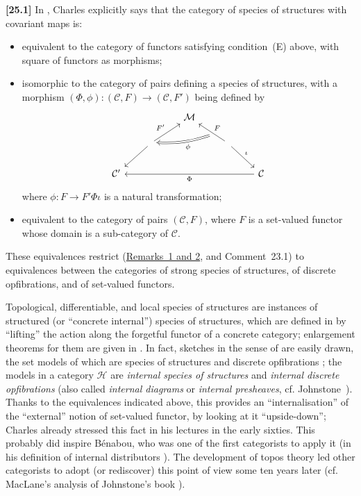 \documentclass[a4paper,fleqn]{article}
\theoremstyle{plain}
\theoremstyle{definition}
\newenvironment{longcomm}[1]
  {\noindent\textbf{[#1]}\rmfamily}
  {}
\newcommand{\CC}{\mathcal{C}}
\newcommand{\HH}{\mathcal{H}}
\newcommand{\MM}{\mathcal{M}}
\begin{document}
\begin{longcomm}{25.1}
  In \cite{coll55}, Charles explicitly says that the category of species of structures with covariant maps is:

  \begin{itemize}
    \item equivalent to the category of functors satisfying condition~(E) above, with square of functors as morphisms;

    \item isomorphic to the category of pairs defining a species of structures, with a morphism $(\Phi,\phi)\colon(\CC,F)\to(\CC,F')$ being defined by
      \[
        \begin{tikzcd}
          &&\MM
        \\& \ar[ur,"F'"] \ar[dl]
          && \ar[ul,swap,"F",""{below,name=F}] \ar[dr,"\iota"] \ar[ll,from=F,Rightarrow,bend left=10,"\phi"]
        \\\CC'
          &&&& \CC \ar[llll,"\Phi"]
        \end{tikzcd}
      \]
      where $\phi\colon F\to F'\Phi\iota$ is a natural transformation;

    \item equivalent to the category of pairs $(\CC,F)$, where $F$ is a set-valued functor whose domain is a sub-category of $\CC$.
  \end{itemize}

  These equivalences restrict (\hyperref[remark:i-2]{Remarks~1 and 2}, and Comment~23.1) to equivalences between the categories of strong species of structures, of discrete opfibrations, and of set-valued functors.

  Topological, differentiable, and local species of structures are instances of structured (or ``concrete internal'') species of structures, which are defined in \cite{coll59,coll60} by ``lifting'' the action along the forgetful functor of a concrete category;
  enlargement theorems for them are given in \cite{coll89,coll90,coll95,coll96}.
  In fact, sketches in the sense of \cite{coll106} are easily drawn, the set models of which are species of structures and discrete opfibrations \cite{coll117};
  the models in a category $\HH$ are \emph{internal species of structures} and \emph{internal discrete opfibrations} (also called \emph{internal diagrams} or \emph{internal presheaves}, cf. Johnstone~\cite{comm56}).
  Thanks to the equivalences indicated above, this provides an ``internalisation'' of the ``external'' notion of set-valued functor, by looking at it ``upside-down'';
  Charles already stressed this fact in his lectures in the early sixties.
  This probably did inspire Bénabou, who was one of the first categorists to apply it (in his definition of internal distributors \cite{comm7}).
  The development of topos theory led other categorists to adopt (or rediscover) this point of view some ten years later (cf. MacLane's analysis of Johnstone's book \cite{comm75}).
\end{longcomm}
\end{document}
